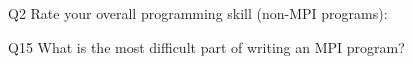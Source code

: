 \begin{description}%
\item{Q2} Rate your overall programming skill (non-MPI programs):%
\item{Q15} What is the most difficult part of writing an MPI program?%
\end{description}%
